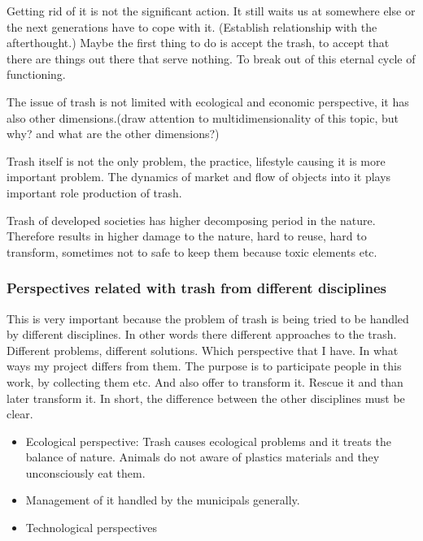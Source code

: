 Getting rid of it is not the significant action. It still waits us at somewhere else or the next generations have to cope with it. (Establish relationship with the afterthought.) Maybe the first thing to do is accept the trash, to accept that there are things out there that serve nothing. To break out of this eternal cycle of functioning.

The issue of trash is not limited with ecological and economic perspective, it has also other dimensions.(draw attention to multidimensionality of this topic, but why? and what are the other dimensions?)

Trash itself is not the only problem, the practice, lifestyle causing it is more important problem. The dynamics of market and flow of objects into it plays important role production of trash.

Trash of developed societies has higher decomposing period in the nature. Therefore results in higher damage to the nature, hard to reuse, hard to transform, sometimes not to safe to keep them because toxic elements etc. 

%
\subsubsection{Perspectives related with trash from different disciplines}
This is very important because the problem of trash is being tried to be handled by different disciplines. In other words there different approaches to the trash. Different problems, different solutions. Which perspective that I have. In what ways my project differs from them. The purpose is to participate people in this work, by collecting them etc. And also offer to transform it. Rescue it and than later transform it. In short, the difference between the other disciplines must be clear. 
\begin{itemize}
\item Ecological perspective: Trash causes ecological problems and it treats the balance of nature. Animals do not aware of plastics materials and they unconsciously eat them.
\item Management of it handled by the municipals generally.
\item Technological perspectives
\end{itemize}


